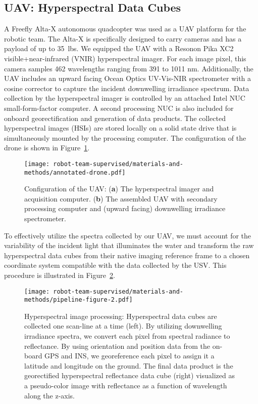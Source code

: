 \subsection{UAV: Hyperspectral Data Cubes}

A Freefly Alta-X autonomous quadcopter was used as a UAV platform for the robotic team. The Alta-X is specifically designed to carry cameras and has a payload of up to 35~lbs. We equipped the UAV with a Resonon Pika XC2 visible+near-infrared (VNIR) hyperspectral imager. For each image pixel, this camera samples 462 wavelengths ranging from 391 to 1011 nm.  Additionally, the UAV includes an upward facing Ocean Optics UV-Vis-NIR spectrometer with a cosine corrector to capture the incident downwelling irradiance spectrum. Data collection by the hyperspectral imager is controlled by an attached Intel NUC small-form-factor computer. A second processing NUC is also included for onboard georectification and generation of data products. The collected hyperspectral images (HSIs) are stored locally on a solid state drive that is simultaneously mounted by the processing computer. The configuration of the drone is shown in Figure~\ref{fig:drone-components}.

\begin{figure}[H]
\vspace{-0.3in}
\hspace{-16pt}\texttt{[image: robot-team-supervised/materials-and-methods/annotated-drone.pdf]}
\vspace{-0.2in}
\caption{Configuration of the UAV: (\textbf{a}) The hyperspectral imager and acquisition computer. (\textbf{b}) The assembled UAV with secondary processing computer and (upward facing) downwelling irradiance spectrometer. \label{fig:drone-components}}
\end{figure} 

To effectively utilize the spectra collected by our UAV, we must account for the variability of the incident light that illuminates the water and transform the raw hyperspectral data cubes from their native imaging reference frame to a chosen coordinate system compatible with the data collected by the USV. This procedure is illustrated in Figure~\ref{fig:hsi-pipeline}.

\begin{figure}[H]
\vspace{-0.3in}
\hspace{-6pt}\texttt{[image: robot-team-supervised/materials-and-methods/pipeline-figure-2.pdf]}
\vspace{-0.4in}
\caption{Hyperspectral image processing: Hyperspectral data cubes are collected one scan-line at a time (left). By utilizing downwelling irradiance spectra, we convert each pixel from spectral radiance to reflectance. By using orientation and position data from the on-board GPS and INS, we georeference each pixel to assign it a latitude and longitude on the ground. The final data product is the georectified hyperspectral reflectance data cube (right) visualized as a pseudo-color image with reflectance  as a function of wavelength along the z-axis.\label{fig:hsi-pipeline}}
\end{figure}  

